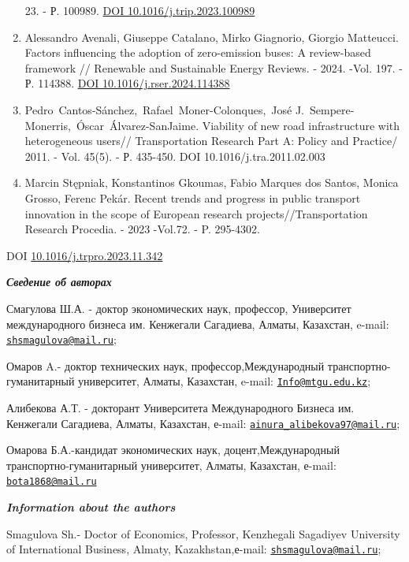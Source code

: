 \begin{enumerate}
  23. - Р. 100989. \href{https://doi.org/10.1016/j.trip.2023.100989}{DOI
  10.1016/j.trip.2023.100989}
\item
  Alessandro Avenali, Giuseppe Catalano, Mirko Giagnorio, Giorgio
  Matteucci. Factors influencing the adoption of zero-emission buses: A
  review-based framework // Renewable and Sustainable Energy Reviews. -
  2024. -Vol. 197. - Р. 114388.
  \href{https://doi.org/10.1016/j.rser.2024.114388}{DOI
  10.1016/j.rser.2024.114388}
\item
  Pedro~Cantos-Sánchez,~Rafael~Moner-Colonques,~José
  J.~Sempere-Monerris,~Óscar~Álvarez-SanJaime. Viability of new road
  infrastructure with heterogeneous users// Transportation Research Part
  A: Policy and Practice/ 2011. - Vol. 45(5). - Р. 435-450. DOI
  10.1016/j.tra.2011.02.003
\item
  Marcin Stępniak, Konstantinos Gkoumas, Fabio Marques dos Santos,
  Monica Grosso, Ferenc Pekár. Recent trends and progress in public
  transport innovation in the scope of European research
  projects//Transportation Research Procedia. - 2023 -Vol.72. - P.
  295-4302.
\end{enumerate}

DOI
\href{https://doi.org/10.1016/j.trpro.2023.11.342}{10.1016/j.trpro.2023.11.342}

\emph{{\bfseries Сведение об авторах}}

Смагулова Ш.А. - доктор экономических наук, профессор, Университет
международного бизнеса им. Кенжегали Сагадиева, Алматы, Казахстан,
e-mail:
\href{mailto:shsmagulova@mail.ru}{\nolinkurl{shsmagulova@mail.ru}};

Омаров A.- доктор технических наук, профессор,Международный
транспортно-гуманитарный университет, Алматы, Казахстан, e-mail:
\href{mailto:Info@mtgu.edu.kz}{\nolinkurl{Info@mtgu.edu.kz}};

Алибекова А.Т. - докторант Университета Международного Бизнеса им.
Кенжегали Сагадиева, Алматы, Казахстан, е-mail:
\href{mailto:ainura_alibekova97@mail.ru}{\nolinkurl{ainura\_alibekova97@mail.ru}};

Омарова Б.А.-кандидат экономических наук, доцент,Международный
транспортно-гуманитарный университет, Алматы, Казахстан, е-mail:
\href{mailto:bota1868@mail.ru}{\nolinkurl{bota1868@mail.ru}}

\emph{{\bfseries Information about the authors}}

Smagulova Sh.- Doctor of Economics, Professor, Kenzhegali Sagadiyev
University of International Business, Almaty, Kazakhstan,е-mail:
\href{mailto:shsmagulova@mail.ru}{\nolinkurl{shsmagulova@mail.ru}};

